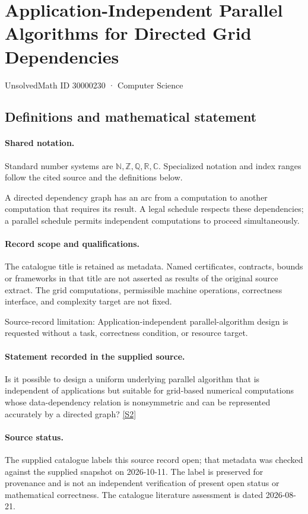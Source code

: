 \documentclass[11pt]{article}
\newcommand{\sref}[2]{\hyperlink{source:#1:#2}{[S#2]}}
\begin{document}
\setcounter{section}{30000229}
\section{Application-Independent Parallel Algorithms for Directed Grid Dependencies}\label{30000230}
{\small\sffamily UnsolvedMath ID 30000230 · Computer Science}
\subsection{Definitions and mathematical statement}

\paragraph{Shared notation.}Standard number systems are $\mathbb N,\mathbb Z,\mathbb Q,\mathbb R,\mathbb C$. Specialized notation and index ranges follow the cited source and the definitions below.


A directed dependency graph has an arc from a computation to another computation that requires its result. A legal schedule respects these dependencies; a parallel schedule permits independent computations to proceed simultaneously.
\paragraph{Record scope and qualifications.}
The catalogue title is retained as metadata. Named certificates, contracts, bounds or frameworks in that title are not asserted as results of the original source extract.
The grid computations, permissible machine operations, correctness interface, and complexity target are not fixed.

Source-record limitation: Application-independent parallel-algorithm design is requested without a task, correctness condition, or resource target.
\paragraph{Statement recorded in the supplied source.}
Is it possible to design a uniform underlying parallel algorithm that is independent of applications but suitable for grid-based numerical computations whose data-dependency relation is nonsymmetric and can be represented accurately by a directed graph? \sref{30000230}{2}
\paragraph{Source status.}
The supplied catalogue labels this source record open; that metadata was checked against the supplied snapshot on 2026-10-11. The label is preserved for provenance and is not an independent verification of present open status or mathematical correctness. The catalogue literature assessment is dated 2026-08-21.
\end{document}
